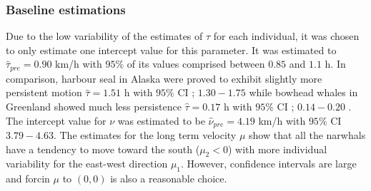 \documentclass[11pt]{article}
\newcommand {\1}{\mathbb{1}}
\begin{document}
\subsubsection{Baseline estimations}
Due to the low variability of the estimates of $\tau$ for each individual, it was chosen to only estimate one intercept value for this parameter. It was estimated to $\hat{\tau}_{pre}=0.90 $ km/h with $95 \%$ of its values comprised between $0.85$ and $1.1$ h.
In comparison, harbour seal in Alaska were proved to exhibit slightly more persistent motion $\hat{\tau}=1.51$ h with $95\%$ CI ; $1.30 -1.75$  \cite{johnson_continuous_2008} while bowhead whales in Greenland showed much less persistence $\hat{\tau}=0.17$ h with $95\%$ CI ; $0.14 -0.20$  \cite{gurarie_correlated_2017}.
The intercept value for $\nu$ was estimated to be $\hat{\nu}_{pre}=4.19$ km/h with $95\%$ CI $3.79-4.63$.
The estimates for the long term velocity $\mu$ show that all the narwhals have a tendency to move toward the south ($\mu_2<0$) with more individual variability for the east-west direction $\mu_1$. However, confidence intervals are large and  forcin $\mu$ to $(0,0)$ is also a reasonable choice.
\end{document}
